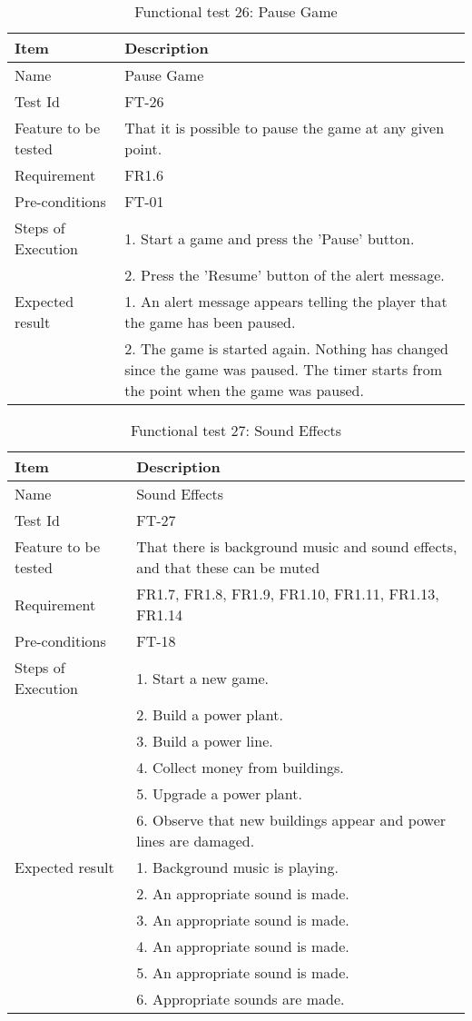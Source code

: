 \begin{table}[H]
\centering
	\begin{tabular}{ l | p{8cm} }
		\hline
		\rowcolor{lightgray}
		{\bf Item} & {\bf Description} \\ \hline
		Name & Pause Game \\ 
		Test Id & FT-26 \\ 
		Feature to be tested & That it is possible to pause the game at any given point. \\ 
		Requirement & FR1.6 \\ 
		Pre-conditions & FT-01 \\ 
		Steps of Execution & 1. Start a game and press the 'Pause' button. \\
		& 2. Press the 'Resume' button of the alert message. \\
		Expected result & 1. An alert message appears telling the player that the game has been paused. \\
		& 2. The game is started again. Nothing has changed since the game was paused. The timer starts from the point when the game was paused. \\
		\hline
	\end{tabular}
	\caption{Functional test 26: Pause Game}
\end{table}

\begin{table}[H]
\centering
	\begin{tabular}{ l | p{8cm} }
		\hline
		\rowcolor{lightgray}
		{\bf Item} & {\bf Description} \\ \hline
		Name & Sound Effects \\ 
		Test Id & FT-27 \\ 
		Feature to be tested & That there is background music and sound effects, and that these can be muted \\ 
		Requirement & FR1.7, FR1.8, FR1.9, FR1.10, FR1.11, FR1.13, FR1.14 \\ 
		Pre-conditions & FT-18 \\ 
		Steps of Execution & 1. Start a new game. \\
		& 2. Build a power plant. \\
		& 3. Build a power line. \\
		& 4. Collect money from buildings. \\
		& 5. Upgrade a power plant. \\
		& 6. Observe that new buildings appear and power lines are damaged. \\
		Expected result & 1. Background music is playing. \\
		& 2. An appropriate sound is made. \\
		& 3. An appropriate sound is made. \\
		& 4. An appropriate sound is made. \\
		& 5. An appropriate sound is made. \\
		& 6. Appropriate sounds are made. \\
		\hline
	\end{tabular}
	\caption{Functional test 27: Sound Effects}
\end{table}

